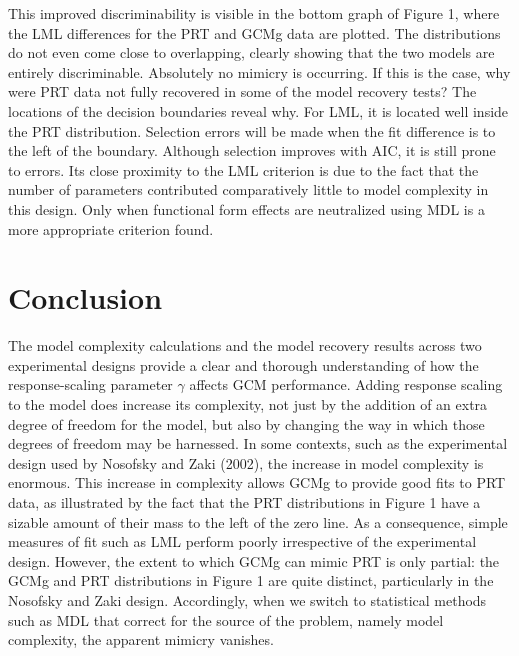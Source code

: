 \documentclass[11pt]{article}
\begin{document}
This improved discriminability is visible in the bottom graph of Figure 1, where the LML
differences for the PRT and GCMg data are plotted. The distributions do not even come close to
overlapping, clearly showing that the two models are entirely discriminable. Absolutely no mimicry
is occurring. If this is the case, why were PRT data not fully recovered in some of the model
recovery tests? The locations of the decision boundaries reveal why. For LML, it is located well
inside the PRT distribution. Selection errors will be made when the fit difference is to the left
of the boundary. Although selection improves with AIC, it is still prone to errors. Its close
proximity to the LML criterion is due to the fact that the number of parameters contributed
comparatively little to model complexity in this design. Only when functional form effects are
neutralized using MDL is a more appropriate criterion found.


\section{Conclusion}


The model complexity calculations and the model recovery results across two experimental designs
provide a clear and thorough understanding of how the response-scaling parameter $\gamma$ affects
GCM performance. Adding response scaling to the model does increase its complexity, not just by
the addition of an extra degree of freedom for the model, but also by changing the way in which
those degrees of freedom may be harnessed. In some contexts, such as the experimental design used
by Nosofsky and Zaki (2002), the increase in model complexity is enormous. This increase in
complexity allows GCMg to provide good fits to PRT data, as illustrated by the fact that the PRT
distributions in Figure 1 have a sizable amount of their mass to the left of the zero line. As a
consequence, simple measures of fit such as LML perform poorly irrespective of the experimental
design. However, the extent to which GCMg can mimic PRT is only partial: the GCMg and PRT
distributions in Figure 1 are quite distinct, particularly in the Nosofsky and Zaki design.
Accordingly, when we switch to statistical methods such as MDL that correct for the source of the
problem, namely model complexity, the apparent mimicry vanishes.


%
\end{document}
